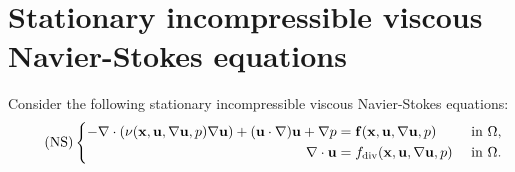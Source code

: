 \documentclass[oneside,11pt]{book}
\numberwithin{equation}{section}
\begin{document}
\section{Stationary incompressible viscous Navier-Stokes equations}
Consider the following stationary incompressible viscous Navier-Stokes equations:
\begin{equation}
    \label{stationary incompressible viscous NSEs}
    \tag{NS}
    \left\{\begin{split}
        -\nabla\cdot\left(\nu({\bf x},{\bf u},\nabla{\bf u},p)\nabla{\bf u}\right) + ({\bf u}\cdot\nabla){\bf u} + \nabla p &= {\bf f}({\bf x},{\bf u},\nabla{\bf u},p) &&\mbox{ in } \Omega,\\
        \nabla\cdot{\bf u} &= f_{\rm div}({\bf x},{\bf u},\nabla{\bf u},p) &&\mbox{ in } \Omega.
    \end{split}\right.
\end{equation}
\end{document}
